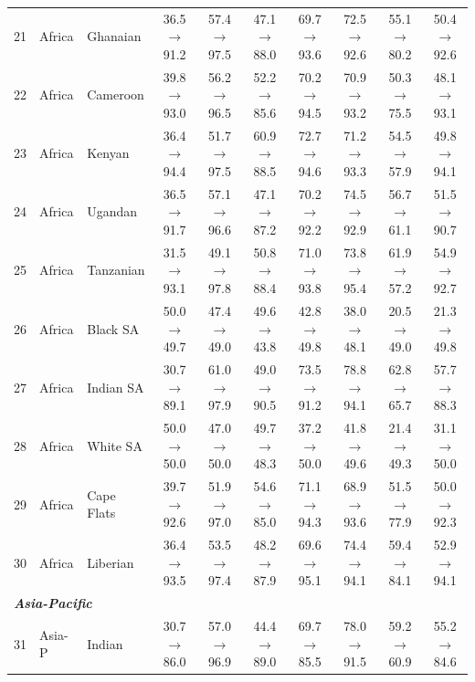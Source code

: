 \begin{table}[t]
{\begin{tabular}{rll c c c c c c c}
21 & Africa & Ghanaian & 36.5$\rightarrow$91.2 & 57.4$\rightarrow$97.5 & 47.1$\rightarrow$88.0 & 69.7$\rightarrow$93.6 & 72.5$\rightarrow$92.6 & 55.1$\rightarrow$80.2 & 50.4$\rightarrow$92.6 \\
22 & Africa & Cameroon & 39.8$\rightarrow$93.0 & 56.2$\rightarrow$96.5 & 52.2$\rightarrow$85.6 & 70.2$\rightarrow$94.5 & 70.9$\rightarrow$93.2 & 50.3$\rightarrow$75.5 & 48.1$\rightarrow$93.1 \\
23 & Africa & Kenyan & 36.4$\rightarrow$94.4 & 51.7$\rightarrow$97.5 & 60.9$\rightarrow$88.5 & 72.7$\rightarrow$94.6 & 71.2$\rightarrow$93.3 & 54.5$\rightarrow$57.9 & 49.8$\rightarrow$94.1 \\
24 & Africa & Ugandan & 36.5$\rightarrow$91.7 & 57.1$\rightarrow$96.6 & 47.1$\rightarrow$87.2 & 70.2$\rightarrow$92.2 & 74.5$\rightarrow$92.9 & 56.7$\rightarrow$61.1 & 51.5$\rightarrow$90.7 \\
25 & Africa & Tanzanian & 31.5$\rightarrow$93.1 & 49.1$\rightarrow$97.8 & 50.8$\rightarrow$88.4 & 71.0$\rightarrow$93.8 & 73.8$\rightarrow$95.4 & 61.9$\rightarrow$57.2 & 54.9$\rightarrow$92.7 \\
26 & Africa & Black SA & 50.0$\rightarrow$49.7 & 47.4$\rightarrow$49.0 & 49.6$\rightarrow$43.8 & 42.8$\rightarrow$49.8 & 38.0$\rightarrow$48.1 & 20.5$\rightarrow$49.0 & 21.3$\rightarrow$49.8 \\
27 & Africa & Indian SA & 30.7$\rightarrow$89.1 & 61.0$\rightarrow$97.9 & 49.0$\rightarrow$90.5 & 73.5$\rightarrow$91.2 & 78.8$\rightarrow$94.1 & 62.8$\rightarrow$65.7 & 57.7$\rightarrow$88.3 \\
28 & Africa & White SA & 50.0$\rightarrow$50.0 & 47.0$\rightarrow$50.0 & 49.7$\rightarrow$48.3 & 37.2$\rightarrow$50.0 & 41.8$\rightarrow$49.6 & 21.4$\rightarrow$49.3 & 31.1$\rightarrow$50.0 \\
29 & Africa & Cape Flats & 39.7$\rightarrow$92.6 & 51.9$\rightarrow$97.0 & 54.6$\rightarrow$85.0 & 71.1$\rightarrow$94.3 & 68.9$\rightarrow$93.6 & 51.5$\rightarrow$77.9 & 50.0$\rightarrow$92.3 \\
30 & Africa & Liberian & 36.4$\rightarrow$93.5 & 53.5$\rightarrow$97.4 & 48.2$\rightarrow$87.9 & 69.6$\rightarrow$95.1 & 74.4$\rightarrow$94.1 & 59.4$\rightarrow$84.1 & 52.9$\rightarrow$94.1 \\
\midrule
\multicolumn{10}{l}{\textit{\textbf{Asia-Pacific}}} \\
31 & Asia-P & Indian & 30.7$\rightarrow$86.0 & 57.0$\rightarrow$96.9 & 44.4$\rightarrow$89.0 & 69.7$\rightarrow$85.5 & 78.0$\rightarrow$91.5 & 59.2$\rightarrow$60.9 & 55.2$\rightarrow$84.6 \\

\end{tabular}}
\end{table}
